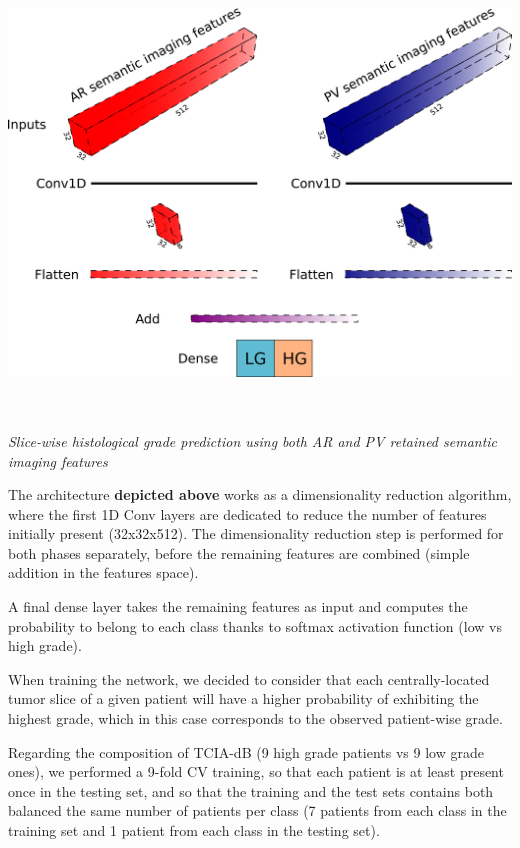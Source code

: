 \documentclass[]{article}
\begin{document}
\includegraphics[width=6.26772in,height=4.59722in]{./images/media/image21.png}

\emph{Slice-wise histological grade prediction using both AR and PV
retained semantic imaging features}

The architecture \textbf{depicted above} works as a dimensionality
reduction algorithm, where the first 1D Conv layers are dedicated to
reduce the number of features initially present (32x32x512). The
dimensionality reduction step is performed for both phases separately,
before the remaining features are combined (simple addition in the
features space).

A final dense layer takes the remaining features as input and computes
the probability to belong to each class thanks to softmax activation
function (low vs high grade).

When training the network, we decided to consider that each
centrally-located tumor slice of a given patient will have a higher
probability of exhibiting the highest grade, which in this case
corresponds to the observed patient-wise grade.

Regarding the composition of TCIA-dB (9 high grade patients vs 9 low
grade ones), we performed a 9-fold CV training, so that each patient is
at least present once in the testing set, and so that the training and
the test sets contains both balanced the same number of patients per
class (7 patients from each class in the training set and 1 patient from
each class in the testing set).
\end{document}
